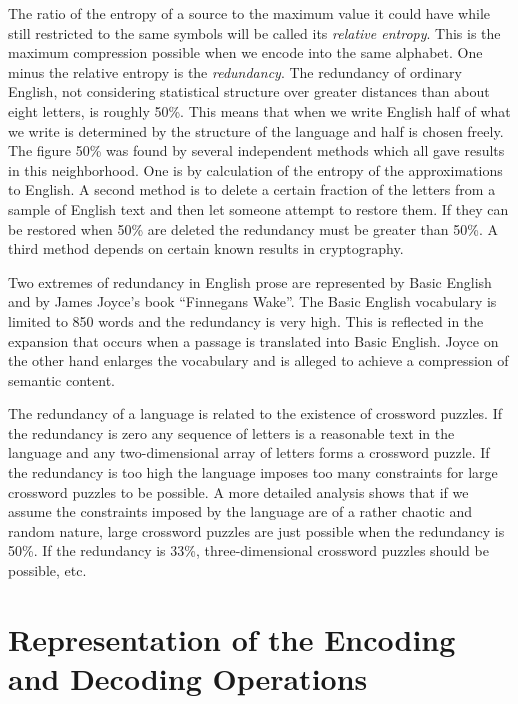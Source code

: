 The ratio of the entropy of a source to the maximum value it could
have while still restricted to the same symbols will be called its
\emph{relative entropy}.  This is the maximum
compression possible when we encode into the same alphabet.  One minus
the relative entropy is the \emph{redundancy}.  The redundancy of ordinary
English, not considering statistical structure over greater distances
than about eight letters, is roughly 50\%.  This means that when we
write English half of what we write is determined by the structure of
the language and half is chosen freely.  The figure 50\% was found by
several independent methods which all gave results in this neighborhood.
One is by calculation of the entropy of the approximations to English.
A second method is to delete a certain fraction of the letters from a
sample of English text and then let someone attempt to restore them.
If they can be restored when 50\% are deleted the redundancy must be
greater than 50\%.  A third method depends on certain known results
in cryptography.

Two extremes of redundancy in English prose are represented by Basic
English and by James Joyce's book ``Finnegans Wake''.  The Basic
English vocabulary is limited to 850 words and the redundancy is very
high.  This is reflected in the expansion that occurs when a passage
is translated into Basic English.  Joyce on the other hand enlarges the
vocabulary and is alleged to achieve a compression of semantic content.

The redundancy of a language is related to the existence of crossword
puzzles.  If the redundancy is zero any sequence of letters is a
reasonable text in the language and any two-dimensional array of letters
forms a crossword puzzle.  If the redundancy is too high the language
imposes too many constraints for large crossword puzzles to be possible.
A more detailed analysis shows that if we assume the constraints imposed
by the language are of a rather chaotic and random nature, large crossword
puzzles are just possible when the redundancy is 50\%.  If the redundancy
is 33\%, three-dimensional crossword puzzles should be possible, etc.

\section{Representation of the Encoding and Decoding Operations}

